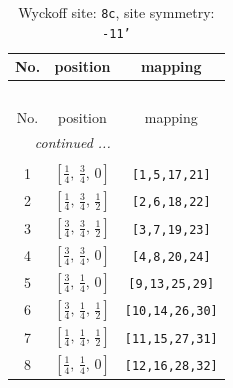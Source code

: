 \documentclass[fleqn,8pt]{jsarticle}
\begin{document}
\renewcommand{\arraystretch}{1.2}
\begin{longtable}{ccc}
\caption{Wyckoff site: {\tt 8c}, site symmetry: {\tt -11'}}
 \\
 \hline \hline
No. & position & mapping \\ \hline \endfirsthead

\multicolumn{2}{l}{\tablename\ \thetable{}} \\
 \hline \hline
No. & position & mapping \\ \hline \endhead

 \hline \hline
\multicolumn{2}{r}{\footnotesize\it continued ...} \\ \endfoot

 \hline \hline
\multicolumn{2}{r}{} \\ \endlastfoot

1 & $\left[ \frac{1}{4},\, \frac{3}{4},\, 0 \right]$ & {\tt [1,5,17,21]} \\ \hline
2 & $\left[ \frac{1}{4},\, \frac{3}{4},\, \frac{1}{2} \right]$ & {\tt [2,6,18,22]} \\ \hline
3 & $\left[ \frac{3}{4},\, \frac{3}{4},\, \frac{1}{2} \right]$ & {\tt [3,7,19,23]} \\ \hline
4 & $\left[ \frac{3}{4},\, \frac{3}{4},\, 0 \right]$ & {\tt [4,8,20,24]} \\ \hline
5 & $\left[ \frac{3}{4},\, \frac{1}{4},\, 0 \right]$ & {\tt [9,13,25,29]} \\ \hline
6 & $\left[ \frac{3}{4},\, \frac{1}{4},\, \frac{1}{2} \right]$ & {\tt [10,14,26,30]} \\ \hline
7 & $\left[ \frac{1}{4},\, \frac{1}{4},\, \frac{1}{2} \right]$ & {\tt [11,15,27,31]} \\ \hline
8 & $\left[ \frac{1}{4},\, \frac{1}{4},\, 0 \right]$ & {\tt [12,16,28,32]} \\
\end{longtable}
\renewcommand{\arraystretch}{1.2}
\end{document}
